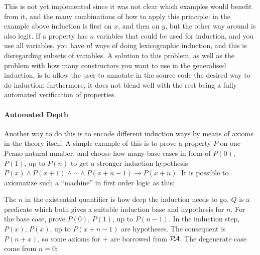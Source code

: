 This is not yet implemented since it was not clear which examples
would benefit from it, and the many combinations of how to apply this
principle: in the example above induction is first on $x$, and then on
$y$, but the other way around is also legit. If a property has $n$
variables that could be used for induction, and you use all variables,
you have $n!$ ways of doing lexicographic induction, and this is
disregarding subsets of variables.  A solution to this problem, as
well as the problem with how many constructors you want to use in the
generalised induction, is to allow the user to annotate in the source
code the desired way to do induction: furthermore, it does not blend
well with the rest being a fully automated verification of properties.


\paragraph{Automated Depth}
Another way to do this is to encode different induction ways by means
of axioms in the theory itself. A simple example of this is to prove a
property $P$ on one Peano natural number, and choose how many base
cases in form of $P(0)$, $P(1)$, up to $P(n)$ to get a stronger
induction hypothesis $P(x)\wedge P(x+1)\wedge \cdots\wedge
P(x+n-1)\rightarrow P(x+n)$. It is possible to axiomatize such a
``machine'' in first order logic as this:

\newcommand{\QZ}[2]{\inferrule* [left=q-0]{ }{Q(#1,#2)}}
\newcommand{\QS}[3]{\inferrule* [left=q-s]{P(#2) \and #3}{Q(#1,#2)}}
\newcommand{\IPZ}[2]{\inferrule* [left=+-0]{#1}{#2}}
\newcommand{\IPS}[2]{\inferrule* [left=+-s]{#1}{#2}}


The $n$ in the existential quantifier is how deep the induction needs
to go. $Q$ is a predicate which both gives a suitable induction base
and hypothesis for $n$. For the base case, prove $P(0)$, $P(1)$, up to
$P(n-1)$. In the induction step,$P(x)$, $P(x)$, up to $P(x+n-1)$ are
hypotheses. The consequent is $P(n+x)$, so some axioms for $+$ are
borrowed from $\mathcal{P\!A}$. The degenerate case come from $n=0$:

